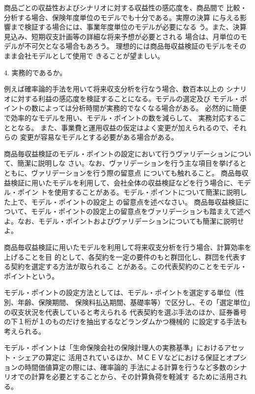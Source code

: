 \documentclass[report,gutter=10mm,fore-edge=10mm,uplatex,dvipdfmx]{jlreq}
\begin{document}
商品ごとの収益性およびシナリオに対する収益性の感応度を、商品間で
比較・分析する場合、保険年度単位のモデルでも十分である。実際の決算
に与える影響まで検証する場合には、事業年度単位のモデルが必要になる
う。また、決算見込み、短期収支計画等の詳細な将来予想が必要とされる
場合は、月単位のモデルが不可欠となる場合もあろう。
理想的には商品毎収益検証のモデルをそのまま会社モデルとして使用で
きることが望ましい。

4. 実務的であるか。

例えば確率論的手法を用いて将来収支分析を行なう場合、数百本以上の
シナリオに対する利益の感応度を検証することになる。モデルの選定及び
モデル・ポイントの数によっては分析時間が実務的でなくなる場合がある。
必然的に簡便で効率的なモデルを用い、モデル・ポイントの数を減らして、
実務対応することとなる。
また、事業費と運用収益の仮定はよく変更が加えられるので、それらの
変更が容易なモデルとする必要がある場合がある。

商品毎収益検証のモデル・ポイントの設定において行うヴァリデーションについて、簡潔に説明しな
さい。なお、ヴァリデーションを行う主な項目を挙げるとともに、ヴァリデーションを行う際の留意点
についても触れること。
商品毎収益検証に用いたモデルを利用して、会社全体の収益検証などを行う場合に、モデル・ポイン
トを使用することがある。モデル・ポイントについて簡潔に説明した上で、モデル・ポイントの設定上
の留意点を述べなさい。
商品毎収益検証について、モデル・ポイントの設定上の留意点をヴァリデーションも踏まえて述べ
よ。なお、モデル・ポイントおよびヴァリデーションについても簡潔に説明せよ。

\answer{}
商品毎収益検証に用いたモデルを利用して将来収支分析を行う場合、計算効率を上げることを目
的として、各契約を一定の要件のもと群団化し、群団を代表する契約を選定する方法が取られるこ
とがある。この代表契約のことをモデル・ポイントという。

モデル・ポイントの設定方法としては、モデル・ポイントを選定する単位（性別、年齢、保険期間、
保険料払込期間、基礎率等）で区分し、その「選定単位」の収支状況を代表していると考えられる
代表契約を選ぶ手法のほか、証券番号の下１桁が１のものだけを抽出するなどランダムかつ機械的
に設定する手法も考えられる。

モデル・ポイントは「生命保険会社の保険計理人の実務基準」におけるアセット・シェアの算定に
活用されているほか、ＭＣＥＶなどにおける保証とオプションの時間価値算定の際には、確率論的
手法による計算を行うなど多数のシナリオでの計算を必要とすることから、その計算負荷を軽減す
るために活用される。
\end{document}
